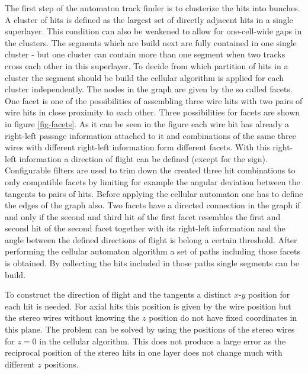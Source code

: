 The first step of the automaton track finder is to clusterize the hits into bunches. A cluster of hits is defined as the largest set of directly adjacent hits in a single superlayer. This condition can also be weakened to allow for one-cell-wide gaps in the clusters. The segments which are build next are fully contained in one single cluster - but one cluster can contain more than one segment when two tracks cross each other in this superlayer. To decide from which partition of hits in a cluster the segment should be build the cellular algorithm is applied for each cluster independently. The nodes in the graph are given by the so called facets. One facet is one of the possibilities of assembling three wire hits with two pairs of wire hits in close proximity to each other. Three possibilities for facets are shown in figure \ref{fig-facets}. As it can be seen in the figure each wire hit has already a right-left passage information attached to it and combinations of the same three wires with different right-left information form different facets. With this right-left information a direction of flight can be defined (except for the sign). Configurable filters are used to trim down the created three hit combinations to only compatible facets by limiting for example the angular deviation between the tangents to pairs of hits. Before applying the cellular automaton one has to define the edges of the graph also. Two facets have a directed connection in the graph if and only if the second and third hit of the first facet resembles the first and second hit of the second facet together with its right-left information and the angle between the defined directions of flight is belong a certain threshold. After performing the cellular automaton algorithm a set of paths including those facets is obtained. By collecting the hits included in those paths single segments can be build.

To construct the direction of flight and the tangents a distinct $x$-$y$ position for each hit is needed. For axial hits this position is given by the wire position but the stereo wires without knowing the $z$ position do not have fixed coordinates in this plane. The problem can be solved by using the positions of the stereo wires for $z = 0$ in the cellular algorithm. This does not produce a large error as the reciprocal position of the stereo hits in one layer does not change much with different $z$ positions.

